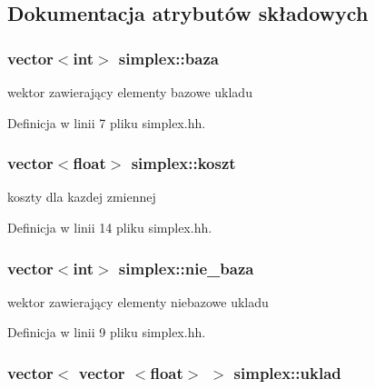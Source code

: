 \subsection{Dokumentacja atrybutów składowych}
\hypertarget{classsimplex_a870de9b2f70ddb41b656f5461c5a4a8f}{
\subsubsection[{baza}]{\setlength{\rightskip}{0pt plus 5cm}vector$<$int$>$ simplex\-::baza\hspace{0.3cm}{\ttfamily [private]}}}\label{classsimplex_a870de9b2f70ddb41b656f5461c5a4a8f}


wektor zawierający elementy bazowe ukladu 



Definicja w linii 7 pliku simplex.\-hh.

\hypertarget{classsimplex_a2c4cdad075abffe54b4a6decc6f0a55e}{
\subsubsection[{koszt}]{\setlength{\rightskip}{0pt plus 5cm}vector$<$float$>$ simplex\-::koszt\hspace{0.3cm}{\ttfamily [private]}}}\label{classsimplex_a2c4cdad075abffe54b4a6decc6f0a55e}


koszty dla kazdej zmiennej 



Definicja w linii 14 pliku simplex.\-hh.

\hypertarget{classsimplex_a24839e2b65652a1441280682657ee062}{
\subsubsection[{nie\-\_\-baza}]{\setlength{\rightskip}{0pt plus 5cm}vector$<$int$>$ simplex\-::nie\-\_\-baza\hspace{0.3cm}{\ttfamily [private]}}}\label{classsimplex_a24839e2b65652a1441280682657ee062}


wektor zawierający elementy niebazowe ukladu 



Definicja w linii 9 pliku simplex.\-hh.

\hypertarget{classsimplex_a7161bd824b374ca4db44066f8909d024}{
\subsubsection[{uklad}]{\setlength{\rightskip}{0pt plus 5cm}vector$<$ vector $<$float$>$ $>$ simplex\-::uklad\hspace{0.3cm}{\ttfamily [private]}}}\label{classsimplex_a7161bd824b374ca4db44066f8909d024}


